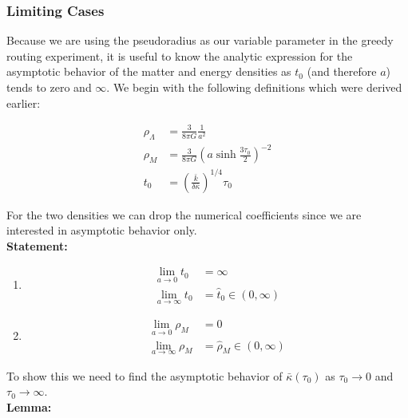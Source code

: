 \documentclass[preprint,notitlepage,amsmath,amssymb,floatfix]{revtex4-1}
\begin{document}

\subsubsection{Limiting Cases}
Because we are using the pseudoradius as our variable parameter in the greedy routing experiment, it is useful to know the analytic expression for the asymptotic behavior of the matter and energy densities as $t_0$ (and therefore $a$) tends to zero and $\infty$.  We begin with the following definitions which were derived earlier:

\begin{align}
\rho_\Lambda &= \frac{3}{8\pi G}\frac{1}{a^2} \\
\rho_M &= \frac{3}{8\pi G}\left(a\sinh\frac{3\tau_0}{2}\right)^{-2} \\
t_0 &= \left(\frac{\bar k}{\delta\bar\kappa}\right)^{1/4}\tau_0
\end{align}

\noindent For the two densities we can drop the numerical coefficients since we are interested in asymptotic behavior only. \\
\textbf{Statement:}
\begin{enumerate}
  \item
  \begin{align}
  \lim_{a\to 0} t_0 &= \infty \\
  \lim_{a\to\infty} t_0 &= \hat{t}_0\in\left(0,\infty\right)
  \end{align}

  \item
  \begin{align}
  \lim_{a\to 0} \rho_M &= 0 \\
  \lim_{a\to\infty} \rho_M &= \hat{\rho}_M\in\left(0,\infty\right)
  \end{align}
\end{enumerate}

\noindent To show this we need to find the asymptotic behavior of $\bar\kappa\left(\tau_0\right)$ as $\tau_0\to 0$ and $\tau_0\to\infty$. \\
\textbf{Lemma:}
\end{document}
